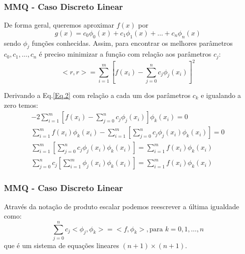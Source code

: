 \documentclass{beamer}
\theoremstyle{mystyle}
\begin{document}
	\begin{frame}
		\frametitle{MMQ - Caso Discreto Linear}
		De forma geral, queremos aproximar $ f(x) $ por
		\begin{equation*}
			g(x) = c_{0}\phi_{0}(x) + c_{1}\phi_{1}(x) +\ldots+ c_{n}\phi_{n}(x)
		\end{equation*}
		sendo $ \phi_{j} $ funções conhecidas. Assim, para encontrar os melhores parâmetros $ c_{0},c_{1},\ldots,c_{n}  $ é preciso minimizar a função com relação aos parâmetros $ c_{j} $:
		\begin{equation}\label{Eq.2}
			<r,r> = \sum_{i=1}^{m} \left[ f(x_{i}) - \sum_{j=0}^{n}c_{j}\phi_{j}(x_{i})\right] ^{2}
		\end{equation}
	\end{frame}

	\begin{frame}[plain]
		Derivando a Eq.\ref{Eq.2} com relação a cada um dos parâmetros $ c_{k} $ e igualando a zero temos:
		\begin{gather*}
			-2\sum_{i=1}^{m} \left[ f(x_{i}) - \sum_{j=0}^{n}c_{j}\phi_{j}(x_{i})\right] \phi_{k}(x_{i}) = 0\\
			\sum_{i=1}^{m}  f(x_{i}) \phi_{k}(x_{i}) - \sum_{i=1}^{m}\left[\sum_{j=0}^{n}c_{j}\phi_{j}(x_{i})\phi_{k}(x_{i})\right] = 0\\
			\sum_{i=1}^{m}\left[\sum_{j=0}^{n}c_{j}\phi_{j}(x_{i})\phi_{k}(x_{i})\right] = 	\sum_{i=1}^{m}  f(x_{i}) \phi_{k}(x_{i}) \\
			\sum_{j=0}^{n}c_{j}\left[\sum_{i=1}^{m}\phi_{j}(x_{i})\phi_{k}(x_{i})\right] = 	\sum_{i=1}^{m}  f(x_{i}) \phi_{k}(x_{i})
		\end{gather*}
	\end{frame}

	\begin{frame}
		\frametitle{MMQ - Caso Discreto Linear}
		Através da notação de produto escalar podemos reescrever a última igualdade como:
		\begin{equation*}
			\sum_{j=0}^{n}c_{j}<\phi_{j},\phi_{k}> = <f,\phi_{k}>, \mbox{para } k = 0,1,\ldots,n
		\end{equation*}
		que é um sistema de equações lineares $ (n + 1)\times(n + 1) $.
	\end{frame}
	
\end{document}

